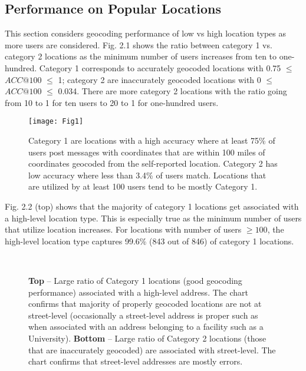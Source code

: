 \subsection{Performance on Popular Locations}

This section considers geocoding performance of low vs high location types as more users are considered. Fig. 2.1 shows the ratio between category 1 vs. category 2 locations as the minimum number of users increases from ten to one-hundred. Category 1 corresponds to accurately geocoded locations with 0.75 $\leq$ $ACC@100$ $\leq$ 1; category 2 are inaccurately geocoded locations with 0 $\leq$ $ACC@100$ $\leq$ 0.034. There are more category 2 locations with the ratio going from 10 to 1 for ten users to 20 to 1 for one-hundred users.

\begin{figure}[!t]
\centering
\texttt{[image: Fig1]}
\caption[Category 1 vs. Category 2 locations]{Category 1 are locations with a high accuracy where at least 75\% of users post messages with coordinates that are within 100 miles of coordinates geocoded from the self-reported location. Category 2 has low accuracy where less than 3.4\% of users match. Locations that are utilized by at least 100 users tend to be mostly Category 1.}
\label{fig_ch2_1}
\end{figure}

Fig. 2.2 (top) shows that the majority of category 1 locations get associated with a high-level location type. This is especially true as the minimum number of users that utilize location increases. For locations with number of users $\geq 100$, the high-level location type captures 99.6\% (843 out of 846) of category 1 locations. 

\begin{figure*}[htp]
\centering
\\
   \caption[Category 1 vs. Category 2 (good vs. poor geocoding performance)]{\textbf{Top} --  Large ratio of Category 1 locations (good geocoding performance) associated with a high-level address. The chart confirms that majority of properly geocoded locations are not at street-level (occasionally a street-level address is proper such as when associated with an address belonging to a facility such as a University). \textbf{Bottom} --  Large ratio of Category 2 locations (those that are inaccurately geocoded) are associated with street-level. The chart confirms that street-level addresses are mostly errors.} \label{fig_ch2_2}
\end{figure*}

